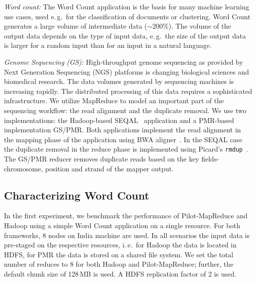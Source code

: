\documentclass{acm_proc_article-sp}
\newcommand{\upp}{\vspace*{-0.5em}}
\newcommand{\pilotmapreduce}{Pilot-MapReduce\xspace}
\begin{document}
{\it Word count:} The Word Count application is the basis for many machine
learning use cases, used e.\,g.\ for the classification of documents or
clustering. Word Count generates a large volume of intermediate data
($\sim$200$\%$). The volume of the output data depends on the type of input
data, e.\,g.\ the size of the output data is larger for a random input than for
an input in a natural language.


{\it Genome Sequencing (GS):} High-throughput genome sequencing as
provided by Next Generation Sequencing (NGS) platforms is changing biological
sciences and biomedical research. The data volumes generated by sequencing
machines is increasing rapidly. The distributed processing of this data requires
a sophisticated infrastructure. We utilize MapReduce to model
an important part of the sequencing workflow: the read alignment and the
duplicate removal. We use two implementations: the Hadoop-based
SEQAL~\cite{seal-2011} application and a PMR-based implementation 
GS/PMR. Both applications implement the read alignment in the mapping phase of
the application using BWA aligner~\cite{Li:2010:FAL:1741823.1741825}. In the
SEQAL case the duplicate removal in the reduce phase is implemented using
Picard's \texttt{rmdup}~\cite{picard}. 
The GS/PMR reducer removes duplicate reads based on the key
fields-chromosome, position and strand of the mapper output.


\subsection{Characterizing Word Count}


In the first experiment, we benchmark the performance of
\pilotmapreduce and Hadoop using a simple Word Count application on a
single resource. For both frameworks, 8 nodes on India machine are
used. In all scenarios the input data is pre-staged on the respective
resources, i.\,e.\ for Hadoop the data is located in HDFS, for PMR the
data is stored on a shared file system. We set the total number of
reduces to 8 for both Hadoop and \pilotmapreduce; further, the default
chunk size of 128\,MB is used. A HDFS replication factor of 2 is used.
\end{document}
